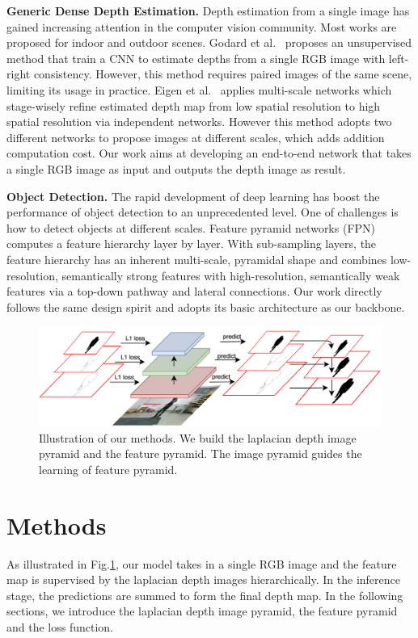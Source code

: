 \documentclass{article} %
\begin{document}
\textbf{Generic Dense Depth Estimation.} Depth estimation from a single image has gained increasing attention in the computer vision community. Most works are proposed for indoor and outdoor scenes. Godard et al.~\cite{godard2017unsupervised} proposes an unsupervised method that train a CNN to estimate depths from a single RGB image with left-right consistency. However, this method requires paired images of the same scene, limiting its usage in practice. Eigen et al.~\cite{eigen2014depth} applies multi-scale networks which stage-wisely refine estimated depth map from low spatial resolution to high spatial resolution via independent networks. However this method adopts two different networks to propose images at different scales, which adds addition computation cost. Our work aims at developing an end-to-end network that takes a single RGB image as input and outputs the depth image as result.

\textbf{Object Detection.} The rapid development of deep learning has boost the performance of object detection to an unprecedented level. One of challenges is how to detect objects at different scales. Feature pyramid networks (FPN)~\cite{lin2017feature} computes a feature hierarchy layer by layer. With sub-sampling layers, the feature hierarchy has an inherent multi-scale, pyramidal shape and combines low-resolution, semantically strong features with high-resolution, semantically weak features via a top-down pathway and lateral connections. Our work directly follows the same design spirit and adopts its basic architecture as our backbone. 
\begin{figure}
    \centering
    \includegraphics[width=\textwidth]{pipeline.png}
    \caption{Illustration of our methods. We build the laplacian depth image pyramid and the feature pyramid. The image pyramid guides the learning of feature pyramid.}
    \label{fig1}
\end{figure}
\section{Methods}
As illustrated in Fig.\ref{fig1}, our model takes in a single RGB image and the feature map is supervised by the laplacian depth images hierarchically. In the inference stage, the predictions are summed to form the final depth map. In the following sections, we introduce the laplacian depth image pyramid, the feature pyramid and the loss function.
\end{document}
